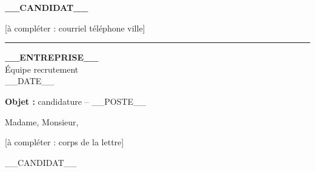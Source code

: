 \documentclass[11pt, a4paper]{article}
\newcommand{\candidat}{__CANDIDAT__}
\newcommand{\coordonnees}{[à compléter : courriel \quad téléphone \quad ville]}
\newcommand{\entreprise}{__ENTREPRISE__}
\newcommand{\destinataire}{Équipe recrutement}
\newcommand{\poste}{__POSTE__}
\newcommand{\datelettre}{__DATE__}
\begin{document}
{\Large\bfseries\color{bleuencre}\candidat}\par\vspace{-0.6em}
{\small\color{midgray}\coordonnees}\par\vspace{0.3em}
{\color{bleuencre!35}\rule{\linewidth}{0.6pt}}

\vspace{1.2em}
\begin{flushright}
  \textbf{\entreprise}\\
  \destinataire\\[0.8em]
  \datelettre
\end{flushright}

\textbf{Objet :} candidature -- \poste

Madame, Monsieur,

[à compléter : corps de la lettre]

\vspace{0.6em}
\candidat
\end{document}
